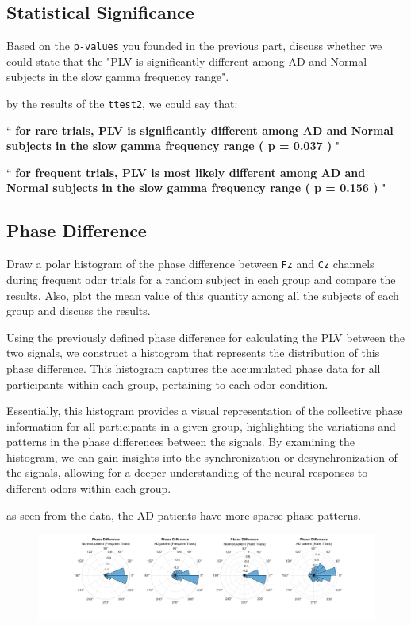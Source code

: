 \documentclass[12pt]{article}
\begin{document}
\subsection{Statistical Significance} Based on the \texttt{p-values} you founded in the previous part, discuss whether we could state that the "PLV is significantly different among AD and Normal subjects in the slow gamma frequency range".
\begin{qsolve}[]
	by the results of the \texttt{ttest2}, we could say that:
	\begin{center}
		``\textbf{
			for rare trials, PLV is significantly different among AD and Normal subjects in the slow gamma frequency range ( p = 0.037 )
		}"

		``\textbf{
			for frequent trials, PLV is most likely different among AD and Normal subjects in the slow gamma frequency range ( p = 0.156 )
		}"
	\end{center}
\end{qsolve}\medskip

\subsection{Phase Difference} Draw a polar histogram of the phase difference between \texttt{Fz} and \texttt{Cz} channels during frequent odor trials for a random subject in each group and compare the results. Also, plot the mean value of this quantity among all the subjects of each group and discuss the results.
\begin{qsolve}[]
	Using the previously defined phase difference for calculating the PLV between the two signals, we construct a histogram that represents the distribution of this phase difference. This histogram captures the accumulated phase data for all participants within each group, pertaining to each odor condition.

	Essentially, this histogram provides a visual representation of the collective phase information for all participants in a given group, highlighting the variations and patterns in the phase differences between the signals. By examining the histogram, we can gain insights into the synchronization or desynchronization of the signals, allowing for a deeper understanding of the neural responses to different odors within each group.

	as seen from the data, the AD patients have more sparse phase patterns.
\end{qsolve}

\begin{figure}[h]
	\centering
	\includegraphics*[width=\linewidth]{../computation/PLV/result/phase_diff.png}
\end{figure}
\end{document}
